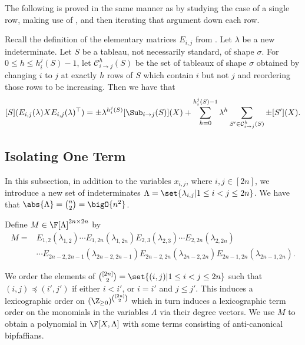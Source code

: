 \documentclass[letterpaper, 11pt]{amsart}
\begin{document}
The following is proved in the same manner as  by studying the case of a single row, making use of , and then iterating that argument down each row.
\begin{lem}\label{lem:Eij_conj}
    Recall the definition of the elementary matrices $E_{i, j}$ from .
    Let $\lambda$ be a new indeterminate.
    Let $S$ be a tableau, not necessarily standard, of shape $\sigma$.
    For $0 \leq h \leq h_{i}^{j}(S) - 1$, let $\mathcal{C}^{h}_{i \to j}(S)$ be the set of tableaux of shape $\sigma$ obtained by changing $i$ to $j$ at exactly $h$ rows of $S$ which contain $i$ but not $j$ and reordering those rows to be increasing.
    Then we have that
    \begin{equation}\label{eq:Eij_conj}
        [S](E_{i, j}(\lambda) X E_{i, j}(\lambda)^\top) = \pm \lambda^{h_{i}^{j}(S)} [\Sub_{i \to j}(S)](X) + \sum_{h = 0}^{h_{i}^{j}(S) - 1} \lambda^h \sum_{S' \in \mathcal{C}^{h}_{i \to j}(S)} \pm  [S'](X).
    \end{equation}
\end{lem}

\subsection{Isolating One Term}\label{sec:extract_pfaff_NEW}

In this subsection, in addition to the variables $x_{i,j}$, where $i, j \in [2n]$, we introduce a new set of indeterminates $\Lambda = \set{\lambda_{i, j} | 1 \leq i < j \leq 2n}$.
We have that $\abs{\Lambda} = \binom{n}{2} = \bigO{n^2}$.

Define $M \in \F[\Lambda]^{2n \times 2n}$ by
\begin{align*}
M ={}& E_{1, 2}(\lambda_{1, 2}) \cdots E_{1, 2n}(\lambda_{1, 2n}) E_{2, 3}(\lambda_{2, 3}) \cdots E_{2, 2n}(\lambda_{2, 2n}) \\ 
&\cdots E_{2n - 2, 2n - 1}(\lambda_{2n - 2, 2n - 1}) E_{2n - 2, 2n}(\lambda_{2n - 2, 2n}) E_{2n - 1, 2n}(\lambda_{2n - 1, 2n}).
\end{align*}

We order the elements of $\binom{[2n]}{2} = \set{(i, j) | 1 \leq i < j \leq 2n}$ such that $(i,j) \preceq (i',j')$ if either $i < i'$, or $i = i'$ and $j \leq j'$.
This induces a lexicographic order on $(\Z_{\geq 0})^{\binom{[2n]}{2}}$ which in turn induces a lexicographic term order on the monomials in the variables $\Lambda$ via their degree vectors.
We use $M$ to obtain a polynomial in $\F[X, \Lambda]$ with some terms consisting of anti-canonical bipfaffians.
\end{document}
